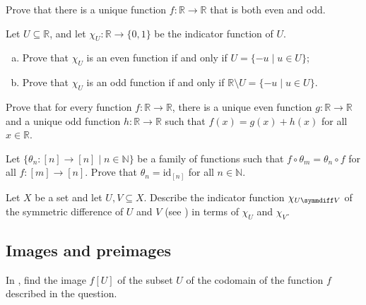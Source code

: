 \begin{chapex}
Prove that there is a unique function $f : \mathbb{R} \to \mathbb{R}$ that is both even and odd.
\end{chapex}

\begin{chapex}
Let $U \subseteq \mathbb{R}$, and let $\chi_U : \mathbb{R} \to \{0,1\}$ be the indicator function of $U$.
\begin{enumerate}[(a)]
\item Prove that $\chi_U$ is an even function if and only if $U = \{ -u \mid u \in U \}$;
\item Prove that $\chi_U$ is an odd function if and only if $\mathbb{R} \setminus U = \{ -u \mid u \in U \}$.
\end{enumerate}
\end{chapex}

\begin{chapex}
Prove that for every function $f : \mathbb{R} \to \mathbb{R}$, there is a unique even function $g : \mathbb{R} \to \mathbb{R}$ and a unique odd function $h : \mathbb{R} \to \mathbb{R}$ such that $f(x)=g(x)+h(x)$ for all $x \in \mathbb{R}$.
\end{chapex}

\begin{chapex}
Let $\{ \theta_n : [n] \to [n] \mid n \in \mathbb{N} \}$ be a family of functions such that $f \circ \theta_m = \theta_n \circ f$ for all $f : [m] \to [n]$. Prove that $\theta_n = \mathrm{id}_{[n]}$ for all $n \in \mathbb{N}$.
\end{chapex}

\begin{chapex}
Let $X$ be a set and let $U, V \subseteq X$. Describe the indicator function $\chi_{U \symmdiff V}$ of the symmetric difference of $U$ and $V$ (see ) in terms of $\chi_U$ and $\chi_V$.
\end{chapex}

\subsection*{Images and preimages}

In , find the image $f[U]$ of the subset $U$ of the codomain of the function $f$ described in the question.

